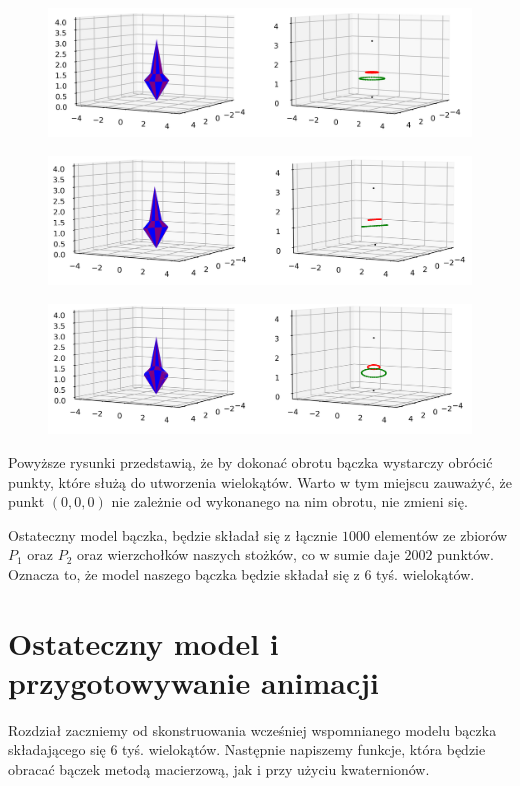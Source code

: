 \documentclass[a4paper,twoside,11pt,reqno]{mwrep}
\theoremstyle{plain} \newtheorem{twr}{Twierdzenie}
\theoremstyle{plain} \newtheorem{lem}{Lemat}
\theoremstyle{definition} \newtheorem{defi}{Definicja}
\theoremstyle{remark} \newtheorem*{wni}{Wniosek}
\theoremstyle{definition} \newtheorem{uwaga}{Uwaga}
\theoremstyle{definition}\newtheorem{prz}{Przykład}
\begin{document}
\begin{figure}[h]
\begin{center}
\includegraphics[width=10 cm]{0.png}
\end{center}
\end{figure}
\newpage
\begin{figure}[h]
\begin{center}
\includegraphics[width=10 cm]{1.png}
\end{center}
\end{figure}
\begin{figure}[h]
\begin{center}
\includegraphics[width=10 cm]{2.png}
\end{center}
\end{figure}
Powyższe rysunki przedstawią, że by dokonać obrotu bączka wystarczy obrócić 
punkty, które służą do utworzenia wielokątów. Warto w tym miejscu zauważyć,
że punkt $(0,0,0)$ nie zależnie od wykonanego na nim obrotu, nie zmieni się.

Ostateczny model bączka, będzie składał się z łącznie $1000$ elementów ze zbiorów $P_1$ oraz $P_2$ oraz wierzchołków naszych stożków, co w sumie daje $2002$ punktów. Oznacza to, że model naszego bączka będzie składał się z $6$ tyś. wielokątów.
\section{Ostateczny model i przygotowywanie animacji}
Rozdział zaczniemy od skonstruowania wcześniej wspomnianego modelu bączka składającego się $6$ tyś. wielokątów.
Następnie napiszemy funkcje, która będzie obracać bączek metodą macierzową, jak i przy użyciu kwaternionów.
\end{document}

